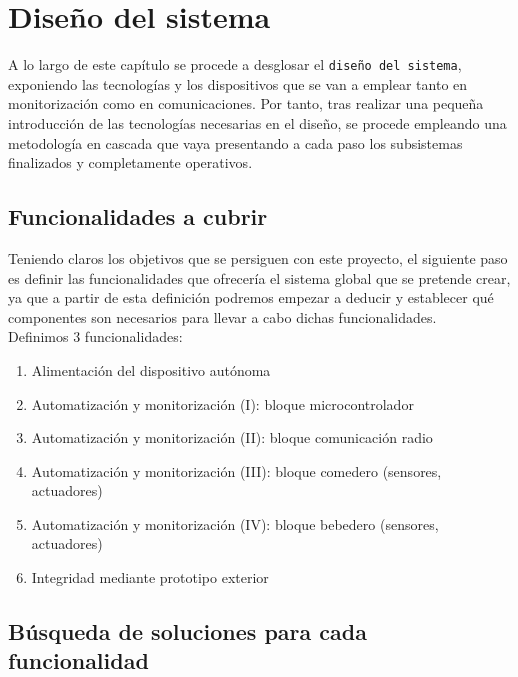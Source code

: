 \documentclass[12pt]{article}
\begin{document}
	\pagebreak
	
	\section[Diseño del sistema]{Diseño del sistema}
	
	\noindent A lo largo de este capítulo se procede a desglosar el \textcolor{RubineRed}{\texttt{diseño del sistema}}, exponiendo las tecnologías y los dispositivos que se van a emplear tanto en monitorización como en comunicaciones. Por tanto, tras realizar una pequeña introducción de las tecnologías necesarias en el diseño, se procede empleando una metodología en cascada que vaya presentando a cada paso los subsistemas finalizados y completamente operativos.
	
	\subsection[Funcionalidades a cubrir]{Funcionalidades a cubrir}
	
	\noindent Teniendo claros los objetivos que se persiguen con este proyecto, el siguiente paso es definir las funcionalidades que ofrecería el sistema global que se pretende crear, ya que a partir de esta definición podremos empezar a deducir y establecer qué componentes son necesarios para llevar a cabo dichas funcionalidades. \\
	
	\noindent Definimos 3 funcionalidades: \\
	
	\begin{enumerate}
		\item Alimentación del dispositivo autónoma
		\item Automatización y monitorización (I): bloque microcontrolador
		\item Automatización y monitorización (II): bloque comunicación radio 
		\item Automatización y monitorización (III): bloque comedero (sensores, actuadores)
		\item Automatización y monitorización (IV): bloque bebedero (sensores, actuadores)
		\item Integridad mediante prototipo exterior
	\end{enumerate}
	
	\subsection[Búsqueda soluciones]{Búsqueda de soluciones para cada funcionalidad}
\end{document}
